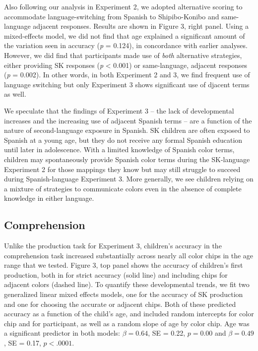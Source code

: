 \documentclass[,man,floatsintext]{apa6}
\theoremstyle{definition}
\theoremstyle{definition}
\theoremstyle{definition}
\theoremstyle{remark}
\begin{document}
Also following our analysis in Experiment 2, we adopted alternative
scoring to accommodate language-switching from Spanish to Shipibo-Konibo
and same-language adjacent responses. Results are shown in Figure 3,
right panel. Using a mixed-effects model, we did not find that age
explained a significant amount of the variation seen in accuracy
(\emph{p} = 0.124), in concordance with earlier analyses. However, we
did find that participants made use of \emph{both} alternative
strategies, either providing SK responses (\emph{p} \textless{} 0.001)
or same-language, adjacent responses (\emph{p} = 0.002). In other words,
in both Experiment 2 and 3, we find frequent use of language switching
but only Experiment 3 shows significant use of djacent terms as well.

We speculate that the findings of Experiment 3 -- the lack of
developmental increases and the increasing use of adjacent Spanish terms
-- are a function of the nature of second-language exposure in Spanish.
SK children are often exposed to Spanish at a young age, but they do not
receive any formal Spanish education until later in adolescence. With a
limited knowledge of Spanish color terms, children may spontaneously
provide Spanish color terms during the SK-language Experiment 2 for
those mappings they know but may still struggle to succeed during
Spanish-language Experiment 3. More generally, we see children relying
on a mixture of strategies to communicate colors even in the absence of
complete knowledge in either language.

\subsection{Comprehension}\label{comprehension-1}

Unlike the production task for Experiment 3, children's accuracy in the
comprehension task increased substantially across nearly all color chips
in the age range that we tested. Figure 3, top panel shows the accuracy
of children's first production, both in for strict accuracy (solid line)
and including chips for adjacent colors (dashed line). To quantify these
developmental trends, we fit two generalized linear mixed effects
models, one for the accuracy of SK production and one for choosing the
accurate or adjacent chips. Both of these predicted accuracy as a
function of the child's age, and included random intercepts for color
chip and for participant, as well as a random slope of age by color
chip. Age was a significant predictor in both models: \(\beta = 0.64\),
SE = 0.22, \(p = 0.00\) and \(\beta = 0.49\), SE = 0.17, \(p < .0001\).
\end{document}
